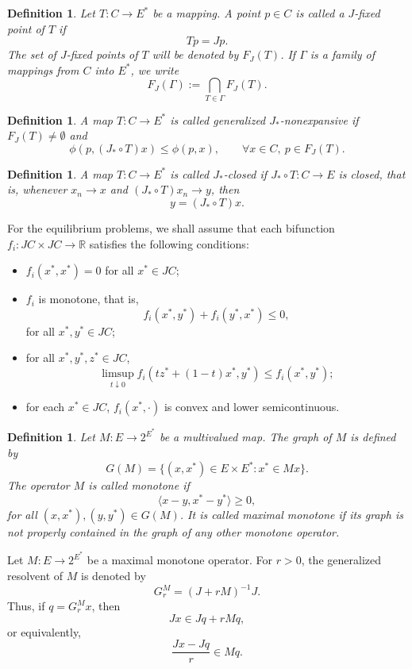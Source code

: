 \documentclass[10pt,a4paper]{amsart}
\newtheorem{definition}[theorem]{Definition}
\numberwithin{equation}{section}
\begin{document}
\begin{definition}
Let $T:C\to E^{*}$ be a mapping. A point $p\in C$ is called a $J$-fixed point of $T$ if
\[
Tp=Jp.
\]
The set of $J$-fixed points of $T$ will be denoted by $F_J(T)$.
If $\Gamma$ is a family of mappings from $C$ into $E^{*}$, we write
\[
F_J(\Gamma):=\bigcap_{T\in \Gamma}F_J(T).
\]
\end{definition}

\begin{definition}
A map $T:C\to E^{*}$ is called generalized $J_{*}$-nonexpansive if $F_J(T)\neq\emptyset$ and
\[
\phi(p,(J_{*}\circ T)x)\leq \phi(p,x),\qquad \forall x\in C,\ p\in F_J(T).
\]
\end{definition}

\begin{definition}
A map $T:C\to E^{*}$ is called $J_{*}$-closed if $J_{*}\circ T:C\to E$ is closed, that is, whenever $x_n\to x$ and $(J_{*}\circ T)x_n\to y$, then
\[
y=(J_{*}\circ T)x.
\]
\end{definition}

For the equilibrium problems, we shall assume that each bifunction $f_i:JC\times JC\to\mathbb{R}$ satisfies the following conditions:
\begin{itemize}
\item[(A1)] $f_i(x^{*},x^{*})=0$ for all $x^{*}\in JC$;
\item[(A2)] $f_i$ is monotone, that is,
\[
f_i(x^{*},y^{*})+f_i(y^{*},x^{*})\leq 0,
\]
for all $x^{*},y^{*}\in JC$;
\item[(A3)] for all $x^{*},y^{*},z^{*}\in JC$,
\[
\limsup_{t\downarrow 0}f_i(tz^{*}+(1-t)x^{*},y^{*})\leq f_i(x^{*},y^{*});
\]
\item[(A4)] for each $x^{*}\in JC$, $f_i(x^{*},\cdot)$ is convex and lower semicontinuous.
\end{itemize}

\begin{definition}
Let $M:E\to 2^{E^{*}}$ be a multivalued map. The graph of $M$ is defined by
\[
G(M)=\{(x,x^{*})\in E\times E^{*}:x^{*}\in Mx\}.
\]
The operator $M$ is called monotone if
\[
\langle x-y,x^{*}-y^{*}\rangle\geq 0,
\]
for all $(x,x^{*}),(y,y^{*})\in G(M)$. It is called maximal monotone if its graph is not properly contained in the graph of any other monotone operator.
\end{definition}

Let $M:E\to 2^{E^{*}}$ be a maximal monotone operator. For $r>0$, the generalized resolvent of $M$ is denoted by
\[
G_r^M=(J+rM)^{-1}J.
\]
Thus, if $q=G_r^Mx$, then
\begin{equation}\label{resolventidentity}
Jx\in Jq+rMq,
\end{equation}
or equivalently,
\[
\frac{Jx-Jq}{r}\in Mq.
\]
\end{document}
